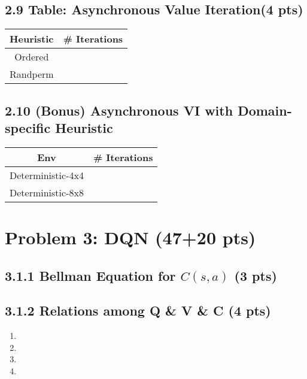 \documentclass[12pt]{article}
\begin{document}
\subsection*{2.9 Table: Asynchronous Value Iteration(4 pts)}
\begin{center}
  \begin{tabular}{|c|c|}\hline
    {\bf Heuristic} & {\bf \# Iterations} \\ \hline
    Ordered & \\ \hline
    Randperm & \\ \hline
  \end{tabular}
\end{center}

\subsection*{2.10 (Bonus) Asynchronous VI with Domain-specific Heuristic}
\begin{solution}[height=5cm]
\begin{center}
  \begin{tabular}{|c|c|}\hline
    {\bf Env} & {\bf \# Iterations} \\ \hline
    Deterministic-4x4 & \\ \hline
    Deterministic-8x8 & \\ \hline
  \end{tabular}
\end{center}

\end{solution}
\newpage
\section*{Problem 3: DQN (47+20 pts)}

\subsection*{3.1.1 Bellman Equation for $C(s, a)$ (3 pts)}
\begin{solution}[height=2cm]
\end{solution}

\subsection*{3.1.2 Relations among Q \& V \& C (4 pts)}
\begin{solution}[height=3.5cm]
\begin{enumerate}[label=(\texttt{\alph*})]
    \item 
    \item 
    \item 
    \item 
\end{enumerate}
\end{solution}
\end{document}
